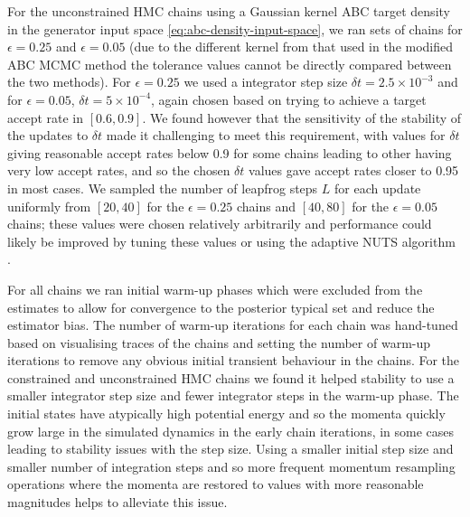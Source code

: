 For the unconstrained \ac{HMC} chains using a Gaussian kernel \ac{ABC} target density in the generator input space \eqref{eq:abc-density-input-space}, we ran sets of chains for $\epsilon = 0.25$ and $\epsilon = 0.05$ (due to the different kernel from that used in the modified \ac{ABC} \ac{MCMC} method the tolerance values cannot be directly compared between the two methods). For $\epsilon = 0.25$ we used a integrator step size $\delta t = 2.5 \times 10^{-3}$ and for $\epsilon = 0.05$, $\delta t = 5 \times 10^{-4}$, again chosen based on trying to achieve a target accept rate in $[0.6,0.9]$. We found however that the sensitivity of the stability of the updates to $\delta t$ made it challenging to meet this requirement, with values for $\delta t$ giving reasonable accept rates below 0.9 for some chains leading to other having very low accept rates, and so the chosen $\delta t$ values gave accept rates closer to 0.95 in most cases. We sampled the number of leapfrog steps $L$ for each update uniformly from $[20,40]$ for the $\epsilon = 0.25$ chains and $[40,80]$ for the $\epsilon = 0.05$ chains; these values were chosen relatively arbitrarily and performance could likely be improved by tuning these values or using the adaptive \ac{NUTS} algorithm \citep{hoffman2014no}.

For all chains we ran initial warm-up phases which were excluded from the estimates to allow for convergence to the posterior typical set and reduce the estimator bias. The number of warm-up iterations for each chain was hand-tuned based on visualising traces of the chains and setting the number of warm-up iterations to remove any obvious initial transient behaviour in the chains. For the constrained and unconstrained \ac{HMC} chains we found it helped stability to use a smaller integrator step size and fewer integrator steps in the warm-up phase. The initial states have atypically high potential energy and so the momenta quickly grow large in the simulated dynamics in the early chain iterations, in some cases leading to stability issues with the step size. Using a smaller initial step size and smaller number of integration steps and so more frequent momentum resampling operations where the momenta are restored to values with more reasonable magnitudes helps to alleviate this issue. 

